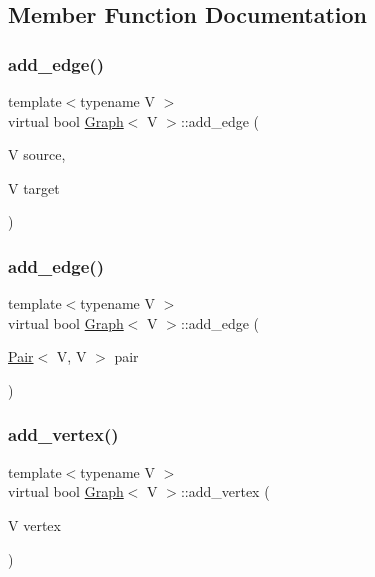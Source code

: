 \subsection{Member Function Documentation}
\mbox{\label{classGraph_a5d4385108258013f08650b8416263491}} 
\subsubsection{\texorpdfstring{add\+\_\+edge()}{add\_edge()}\hspace{0.1cm}{\footnotesize\ttfamily [1/2]}}
{\footnotesize\ttfamily template$<$typename V $>$ \\
virtual bool \hyperlink{classGraph}{Graph}$<$ V $>$\+::add\+\_\+edge (\begin{DoxyParamCaption}\item[{V}]{source,  }\item[{V}]{target }\end{DoxyParamCaption})\hspace{0.3cm}{\ttfamily [virtual]}}

\mbox{\label{classGraph_a7f53ea4210373a0cc23387f8fd00c407}} 
\subsubsection{\texorpdfstring{add\+\_\+edge()}{add\_edge()}\hspace{0.1cm}{\footnotesize\ttfamily [2/2]}}
{\footnotesize\ttfamily template$<$typename V $>$ \\
virtual bool \hyperlink{classGraph}{Graph}$<$ V $>$\+::add\+\_\+edge (\begin{DoxyParamCaption}\item[{\hyperlink{classPair}{Pair}$<$ V, V $>$}]{pair }\end{DoxyParamCaption})\hspace{0.3cm}{\ttfamily [virtual]}}

\mbox{\label{classGraph_ab7b409e1f6b821729cc50f0b841839cf}} 
\subsubsection{\texorpdfstring{add\+\_\+vertex()}{add\_vertex()}}
{\footnotesize\ttfamily template$<$typename V $>$ \\
virtual bool \hyperlink{classGraph}{Graph}$<$ V $>$\+::add\+\_\+vertex (\begin{DoxyParamCaption}\item[{V}]{vertex }\end{DoxyParamCaption})\hspace{0.3cm}{\ttfamily [virtual]}}

